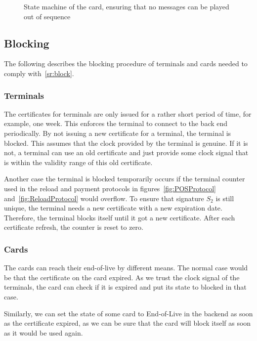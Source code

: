 \documentclass{article}
\begin{document}
\begin{figure}
    \centering
    
    \caption{State machine of the card, ensuring that no messages can be played out of sequence}
    \label{fig:stateMachine}
\end{figure}

\subsection{Blocking} \label{sec:blocking}
The following describes the blocking procedure of terminals and cards needed to comply with~\ref{sr:block}.

\subsubsection{Terminals} \label{sec:blockTerminal}
The certificates for terminals are only issued for a rather short period of time, for example, one week.
This enforces the terminal to connect to the back end periodically.
By not issuing a new certificate for a terminal, the terminal is blocked.
This assumes that the clock provided by the terminal is genuine.
If it is not, a terminal can use an old certificate and just provide some clock signal that is within the validity range of this old certificate.

Another case the terminal is blocked temporarily occurs if the terminal counter used in the reload and payment protocols in figures~\ref{fig:POSProtocol} and~\ref{fig:ReloadProtocol} would overflow.
To ensure that signature $S_2$ is still unique, the terminal needs a new certificate with a new expiration date.
Therefore, the terminal blocks itself until it got a new certificate.
After each certificate refresh, the counter is reset to zero.

\subsubsection{Cards} \label{sec:blockCards}
The cards can reach their end-of-live by different means.
The normal case would be that the certificate on the card expired.
As we trust the clock signal of the terminals, the card can check if it is expired and put its state to blocked in that case.

Similarly, we can set the state of some card to End-of-Live in the backend as soon as the certificate expired, as we can be sure that the card will block itself as soon as it would be used again.
\end{document}
